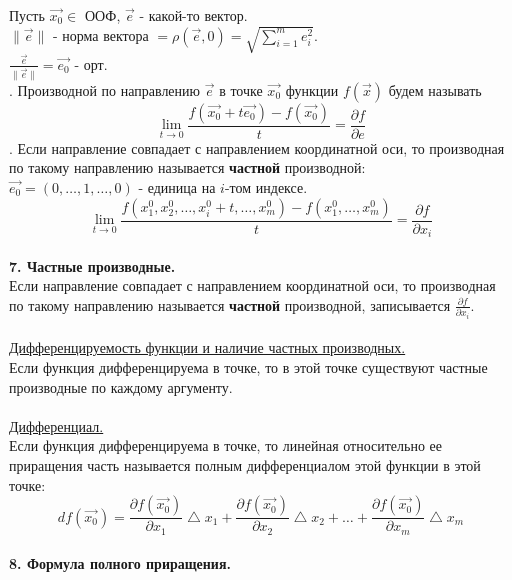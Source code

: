 \documentclass[12pt]{article}
\begin{document}
Пусть $\overrightarrow{x_0} \in$ ООФ, $\overrightarrow{e}$ - какой-то вектор.\\
$\| \overrightarrow{e} \|$ - норма вектора $= \rho(\overrightarrow{e}, 0) = \sqrt{\sum_{i=1}^m e_i^2}$.\\
$\frac{\overrightarrow{e}}{\| \overrightarrow{e} \|} = \overrightarrow{e_0}$ - орт.\\
\indent {}. Производной по направлению $\overrightarrow{e}$ в точке $\overrightarrow{x_0}$ функции $f(\overrightarrow{x})$ будем называть\\
$$\lim_{t\to 0} \frac{f(\overrightarrow{x_0}+t\overrightarrow{e_0})-f(\overrightarrow{x_0})}{t} = \frac{\partial f}{\partial e}$$
\indent {}. Если направление совпадает с направлением координатной оси, то производная по такому направлению называется \textbf{частной} производной:\\
$\overrightarrow{e_0} = (0,\dots,1,\dots,0)$ - единица на $i$-том индексе.\\
$$\lim_{t\to 0} \frac{f(x_1^0, x_2^0, \dots, x_i^0 + t, \dots, x_m^0)-f(x_1^0, \dots, x_m^0)}{t} = \frac{\partial f}{\partial x_i}$$
\\
\label{question7_1}\textbf{7. Частные производные.}\\
Если направление совпадает с направлением координатной оси, то производная по такому направлению называется \textbf{частной} производной, записывается $\frac{\partial f}{\partial x_i}$.\\
\\
\label{question7_2}\underline{Дифференцируемость функции и наличие частных производных.}\\
Если функция дифференцируема в точке, то в этой точке существуют частные производные по каждому аргументу.\\
\\
\label{question7_3}\underline{Дифференциал.}\\
Если функция дифференцируема в точке, то линейная относительно ее приращения часть называется полным дифференциалом этой функции в этой точке:\\
$$df(\overrightarrow{x_0}) = \frac{\partial f(\overrightarrow{x_0})}{\partial x_1} \bigtriangleup x_1 + \frac{\partial f(\overrightarrow{x_0})}{\partial x_2} \bigtriangleup x_2 + \dots + \frac{\partial f(\overrightarrow{x_0})}{\partial x_m} \bigtriangleup x_m$$
\\
\label{question8_1}\textbf{8. Формула полного приращения.}\\
\end{document}
